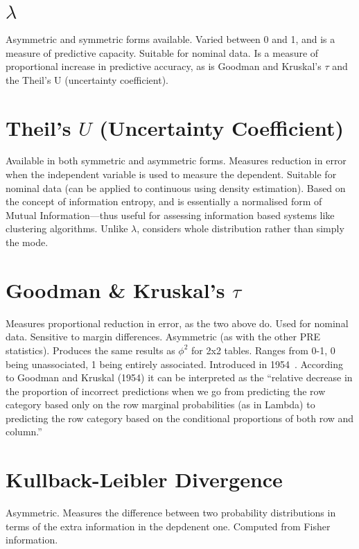 \documentclass[11pt]{article}
\begin{document}
\section{$\lambda$}
Asymmetric and symmetric forms available.  Varied between 0 and 1, and is a measure of predictive capacity.  Suitable for nominal data.  Is a measure of proportional increase in predictive accuracy, as is Goodman and Kruskal's $\tau$ and the Theil's U (uncertainty coefficient).





\section{Theil's $U$ (Uncertainty Coefficient)}
Available in both symmetric and asymmetric forms.  Measures reduction in error when the independent variable is used to measure the dependent.  Suitable for nominal data (can be applied to continuous using density estimation).  Based on the concept of information entropy, and is essentially a normalised form of Mutual Information---thus useful for assessing information based systems like clustering algorithms.  Unlike $\lambda$, considers whole distribution rather than simply the mode.




\section{Goodman \& Kruskal's $\tau$}
Measures proportional reduction in error, as the two above do.  Used for nominal data. Sensitive to margin differences.  Asymmetric (as with the other PRE statistics).  Produces the same results as $\phi^2$ for 2x2 tables.  Ranges from 0-1, 0 being unassociated, 1 being entirely associated.  Introduced in 1954~\cite{goodman1954measures}.
According to Goodman and Kruskal (1954) it can be interpreted as the ``relative decrease in the proportion of incorrect predictions when we go from predicting the row category based only on the row marginal probabilities (as in Lambda) to predicting the row category based on the conditional proportions of both row and column.''



\section{Kullback-Leibler Divergence}
Asymmetric.  Measures the difference between two probability distributions in terms of the extra information in the depdenent one.  Computed from Fisher information.  
\end{document}
